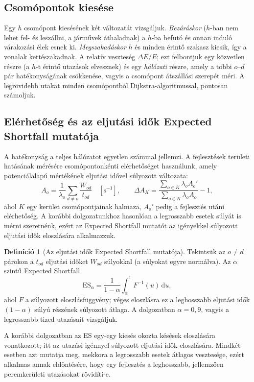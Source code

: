 \documentclass[12pt,a4paper]{article}
\theoremstyle{definition}
\newtheorem{definicio}[tetel]{Definíció}
\theoremstyle{remark}
\begin{document}
\subsection{Csomópontok kiesése}

Egy $h$ csomópont kiesésének két változatát vizsgáljuk. \emph{Bezáráskor}
($h$-ban nem lehet fel- és leszállni, a járművek áthaladnak) a $h$-ba befutó
és onnan induló várakozási élek esnek ki. \emph{Megszakadáskor} $h$ és minden
érintő szakasz kiesik, így a vonalak kettészakadnak. A relatív veszteség
$\Delta E/E$; ezt felbontjuk egy közvetlen részre (a $h$-t érintő utazások
elvesznek) és egy \emph{hálózati} részre, amely a többi $o$--$d$ pár
hatékonyságának csökkenése, vagyis a csomópont átszállási szerepét méri. A
legrövidebb utakat minden csomópontból Dijkstra-algoritmussal, pontosan
számoljuk.

\subsection{Elérhetőség és az eljutási idők Expected Shortfall mutatója}

A hatékonyság a teljes hálózatot egyetlen számmal jellemzi. A fejlesztések
területi hatásának mérésére csomópontonkénti elérhetőséget használunk, amely
\citet{hansen1959} potenciálalapú mértékének eljutási idővel súlyozott
változata:
\[
  A_o=\frac{1}{\lambda_o}\sum_{d\ne o}\frac{W_{od}}{t_{od}}\quad[\mathrm s^{-1}],\qquad
  \Delta A_K=\frac{\sum_{o\in K}\lambda_oA_o'}{\sum_{o\in K}\lambda_oA_o}-1,
\]
ahol $K$ egy kerület csomópontjainak halmaza, $A_o'$ pedig a fejlesztés utáni
elérhetőség. A korábbi dolgozatunkhoz hasonlóan a legrosszabb esetek
súlyát is mérni szeretnénk, ezért az Expected Shortfall mutatót
\citep{acerbi2002} az igényekkel súlyozott eljutási idők eloszlására
alkalmazzuk.

\begin{definicio}[Az eljutási idők Expected Shortfall mutatója]
Tekintsük az $o\ne d$ párokon a $t_{od}$ eljutási időket $W_{od}$
súlyokkal (a súlyokat egyre normálva). Az $\alpha$ szintű Expected Shortfall
\[
  \mathrm{ES}_\alpha=\frac{1}{1-\alpha}\int_\alpha^1 F^{-1}(u)\,\mathrm du ,
\]
ahol $F$ a súlyozott eloszlásfüggvény; véges eloszlásra ez a leghosszabb
eljutási idők $(1-\alpha)$ súlyú részének súlyozott átlaga. A dolgozatban
$\alpha=0{,}9$, vagyis a legrosszabb tized utazásait vizsgáljuk.
\end{definicio}

A korábbi dolgozatban az ES egy-egy kiesés okozta késések eloszlására
vonatkozott; itt az utazási igénnyel súlyozott eljutási idők eloszlására.
Mindkét esetben azt mutatja meg, mekkora a legrosszabb esetek átlagos
vesztesége, ezért alkalmas annak eldöntésére, hogy egy fejlesztés a
leghosszabb, jellemzően peremkerületi utazásokat rövidíti-e.
\end{document}
